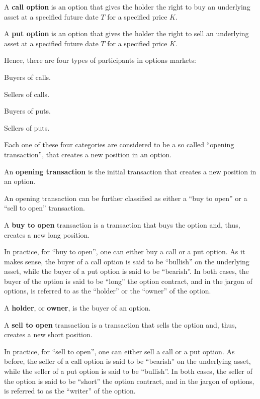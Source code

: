 A \textbf{call option} is an option that gives the holder the right to buy an underlying asset at a specified future
date $T$ for a specified price $K$.
\ed

A \textbf{put option} is an option that gives the holder the right to sell an underlying asset at a specified future
date $T$ for a specified price $K$.
\ed

Hence, there are four types of participants in options markets:
\bit
\item Buyers of calls.
\item Sellers of calls.
\item Buyers of puts.
\item Sellers of puts.
\eit

Each one of these four categories are considered to be a so called ``opening transaction'', that creates a new position
in an option.

An \textbf{opening transaction} is the initial transaction that creates a new position in an option.
\ed

An opening transaction can be further classified as either a ``buy to open'' or a ``sell to open'' transaction.

A \textbf{buy to open} transaction is a transaction that buys the option and, thus, creates a new long position.
\ed

In practice, for ``buy to open'', one can either buy a call or a put option. As it makes sense, the buyer of a call
option is said to be ``bullish'' on the underlying asset, while the buyer of a put option is said to be ``bearish''. In
both cases, the buyer of the option is said to be ``long'' the option contract, and in the jargon of options, is
referred to as the ``holder'' or the ``owner'' of the option.

A \textbf{holder}, or \textbf{owner}, is the buyer of an option.
\ed

A \textbf{sell to open} transaction is a transaction that sells the option and, thus, creates a new short position.
\ed

In practice, for ``sell to open'', one can either sell a call or a put option. As before, the seller of a call option is
said to be ``bearish'' on the underlying asset, while the seller of a put option is said to be ``bullish''. In both
cases, the seller of the option is said to be ``short'' the option contract, and in the jargon of options, is referred
to as the ``writer'' of the option.

